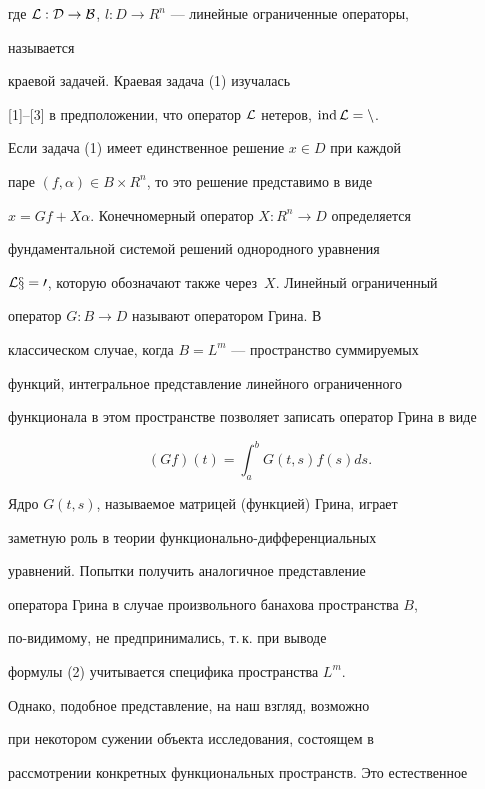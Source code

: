 где $\cal L:D\to B$, $l:D\to R^n$ --- линейные ограниченные операторы, 


называется  


краевой задачей. Краевая задача (1) изучалась  


[1]--[3] в предположении, что оператор $\cal L$ нетеров, $\operatorname{ind}\cal L=n$. 


Если задача (1) имеет единственное решение $x\in D$ при каждой  


паре $(f,\alpha)\in B\times R^n$, то это решение представимо в виде 


$x=G f+X\alpha$. Конечномерный оператор $X:R^n\to D$ определяется  


фундаментальной системой решений однородного уравнения  


$\cal L x=0$, которую обозначают также через~$X$. Линейный ограниченный  


оператор $G:B\to D$ называют оператором Грина. В 


классическом случае, когда $B=L^m$ --- пространство суммируемых  


функций, интегральное представление линейного ограниченного  


функционала в этом пространстве позволяет записать оператор Грина в виде  


\begin{equation} 


(G f)(t)=\int^b_a G(t,s)f(s)d s. 


\end{equation} 


 


Ядро $G(t,s)$, называемое матрицей (функцией) Грина, играет  


заметную роль в теории функционально-дифференциальных  


уравнений. Попытки получить аналогичное представление  


оператора Грина в случае произвольного банахова пространства $B$,  


по-видимому, не предпринимались, т.\,к. при выводе  


формулы (2) учитывается специфика пространства $L^m$.  


Однако, подобное представление, на наш взгляд, возможно  


при некотором сужении объекта исследования, состоящем в  


рассмотрении конкретных функциональных пространств. Это естественное  


